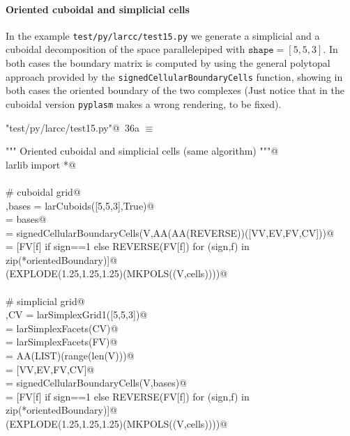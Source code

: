 \documentclass[11pt,oneside]{article}    %
\begin{document}
\paragraph{Oriented cuboidal and simplicial cells}
In the example \texttt{test/py/larcc/test15.py} we generate a simplicial and a cuboidal decomposition of the space parallelepiped with $\texttt{shape}=[5,5,3]$.
In both cases the boundary matrix is computed by using the general polytopal approach provided by the \texttt{signedCellularBoundaryCells} function, showing in both cases the oriented boundary of the two complexes
(Just notice that in the cuboidal version \texttt{pyplasm} makes a wrong rendering, to be fixed).

\begin{flushleft} \small \label{scrap57}
\protect{}\verb@"test/py/larcc/test15.py"@\nobreak\ {\footnotesize 36a }$\equiv$
\vspace{-1ex}
\begin{list}{}{} \item
\mbox{}\verb@""" Oriented cuboidal and simplicial cells (same algorithm) """@\\
\mbox{}\verb@from larlib import *@\\
\mbox{}\verb@@\\
\mbox{}\verb@# cuboidal grid@\\
\mbox{}\verb@V,bases = larCuboids([5,5,3],True)@\\
\mbox{}\verb@[VV,EV,FV,CV] = bases@\\
\mbox{}\verb@orientedBoundary = signedCellularBoundaryCells(V,AA(AA(REVERSE))([VV,EV,FV,CV]))@\\
\mbox{}\verb@cells = [FV[f] if sign==1 else REVERSE(FV[f])  for (sign,f) in zip(*orientedBoundary)]@\\
\mbox{}\verb@VIEW(EXPLODE(1.25,1.25,1.25)(MKPOLS((V,cells))))@\\
\mbox{}\verb@@\\
\mbox{}\verb@# simplicial grid@\\
\mbox{}\verb@V,CV = larSimplexGrid1([5,5,3])@\\
\mbox{}\verb@FV = larSimplexFacets(CV)@\\
\mbox{}\verb@EV = larSimplexFacets(FV)@\\
\mbox{}\verb@VV = AA(LIST)(range(len(V)))@\\
\mbox{}\verb@bases = [VV,EV,FV,CV]@\\
\mbox{}\verb@orientedBoundary = signedCellularBoundaryCells(V,bases)@\\
\mbox{}\verb@cells = [FV[f] if sign==1 else REVERSE(FV[f])  for (sign,f) in zip(*orientedBoundary)]@\\
\mbox{}\verb@VIEW(EXPLODE(1.25,1.25,1.25)(MKPOLS((V,cells))))@\\
\mbox{}\verb@@{\NWsep}
\end{list}
\vspace{-2ex}
\end{flushleft}
\end{document}
